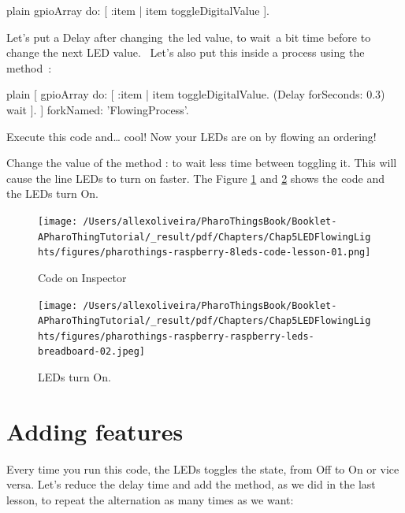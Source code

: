 \documentclass[10pt,twoside,english]{_support/latex/sbabook/sbabook}
\begin{document}
\begin{displaycode}{plain}
gpioArray do: [ :item | item toggleDigitalValue ].
\end{displaycode}

Let's put a Delay after changing the led value, to wait a bit time before to change the next LED value.  Let's also put this inside a process using the method :

\begin{displaycode}{plain}
[
    gpioArray do: [ :item | item toggleDigitalValue. (Delay forSeconds: 0.3) wait ].
] forkNamed: 'FlowingProcess'.
\end{displaycode}

Execute this code and… cool! Now your LEDs are on by flowing an ordering!

Change the value of the method : to wait less time between toggling it. This will cause the line LEDs to turn on faster. The Figure \ref{Inspector8LEDs} and \ref{8LEDs} shows the code and the LEDs turn On.


\begin{figure}

\begin{center}
\texttt{[image: /Users/allexoliveira/PharoThingsBook/Booklet-APharoThingTutorial/\_result/pdf/Chapters/Chap5LEDFlowingLights/figures/pharothings-raspberry-8leds-code-lesson-01.png]}\caption{Code on Inspector\label{Inspector8LEDs}}\end{center}
\end{figure}


\begin{figure}

\begin{center}
\texttt{[image: /Users/allexoliveira/PharoThingsBook/Booklet-APharoThingTutorial/\_result/pdf/Chapters/Chap5LEDFlowingLights/figures/pharothings-raspberry-raspberry-leds-breadboard-02.jpeg]}\caption{LEDs turn On.\label{8LEDs}}\end{center}
\end{figure}

\section{Adding features}
Every time you run this code, the LEDs toggles the state, from Off to On or vice versa. Let’s reduce the delay time and add the  method, as we did in the last lesson, to repeat the alternation as many times as we want:
\end{document}
